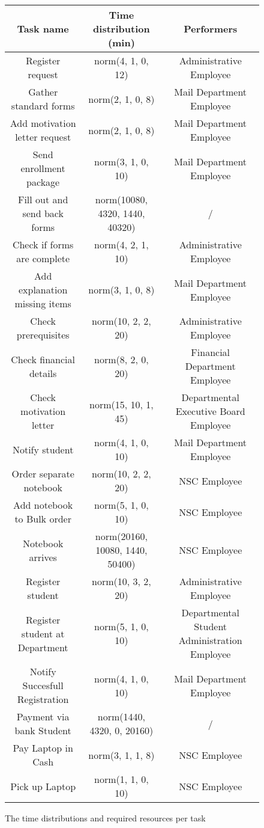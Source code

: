 \begin{figure}[h!]
	\centering
	\begin{tabular}{ | c | c | c | }
		\hline
		\textbf{Task name} & \textbf{Time distribution (min)} & \textbf{Performers}\\ \hline\hline
		Register request & norm(4, 1, 0, 12) & Administrative Employee \\ \hline
		Gather standard forms & norm(2, 1, 0, 8) & Mail Department Employee \\ \hline
		Add motivation letter request & norm(2, 1, 0, 8) & Mail Department Employee \\ \hline
		Send enrollment package & norm(3, 1, 0, 10) & Mail Department Employee \\ \hline
		Fill out and send back forms & norm(10080, 4320, 1440, 40320) & / \\ \hline
		Check if forms are complete & norm(4, 2, 1, 10) & Administrative Employee \\ \hline
		Add explanation missing items & norm(3, 1, 0, 8) & Mail Department Employee \\ \hline
		Check prerequisites & norm(10, 2, 2, 20) & Administrative Employee \\ \hline
		Check financial details & norm(8, 2, 0, 20) & Financial Department Employee \\ \hline
		Check motivation letter & norm(15, 10, 1, 45) & Departmental Executive Board Employee \\ \hline
		Notify student & norm(4, 1, 0, 10) & Mail Department Employee \\ \hline
		Order separate notebook & norm(10, 2, 2, 20) & NSC Employee \\ \hline
		Add notebook to Bulk order & norm(5, 1, 0, 10) & NSC Employee \\ \hline
		Notebook arrives & norm(20160, 10080, 1440, 50400) & NSC Employee \\ \hline
		Register student & norm(10, 3, 2, 20) & 
		Administrative Employee \\ \hline
		Register student at Department & norm(5, 1, 0, 10) & Departmental Student Administration Employee \\ \hline
		Notify Succesfull Registration & norm(4, 1, 0, 10) & Mail Department Employee \\ \hline
		Payment via bank Student & norm(1440, 4320, 0, 20160) & / \\ \hline
		Pay Laptop in Cash & norm(3, 1, 1, 8) & NSC Employee \\ \hline
		Pick up Laptop & norm(1, 1, 0, 10) & NSC Employee \\
		\hline
	\end{tabular}
	\caption{The time distributions and required resources per task}
	\label{fig:tasktimes1}
\end{figure}
	
